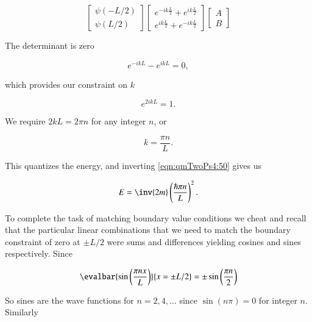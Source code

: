 \begin{equation}\label{eqn:qmTwoPs4:90}
\begin{bmatrix}
\psi(-L/2) \\
\psi(L/2)
\end{bmatrix}
\begin{bmatrix}
e^{ -i k \frac{L}{2} } +e^{ i k \frac{L}{2} } \\
e^{ i k \frac{L}{2} } +e^{ -i k \frac{L}{2} }
\end{bmatrix}
\begin{bmatrix}
A \\
B
\end{bmatrix}
\end{equation}

The determinant is zero

\begin{equation}\label{eqn:qmTwoPs4:110}
e^{-i k L} - e^{i k L} = 0,
\end{equation}

which provides our constraint on $k$ 

\begin{equation}\label{eqn:qmTwoPs4:130}
e^{2 i k L} = 1.
\end{equation}

We require $2 k L = 2 \pi n$ for any integer $n$, or

\begin{equation}\label{eqn:qmTwoPs4:150}
k = \frac{\pi n}{L}.
\end{equation}

This quantizes the energy, and inverting \ref{eqn:qmTwoPs4:50} gives us

\begin{equation}\label{eqn:qmTwoPs4:170}
E = \inv{2m} \left( \frac{\hbar \pi n }{L} \right)^2.
\end{equation}

To complete the task of matching boundary value conditions we cheat and recall that the particular linear combinations that we need to match the boundary constraint of zero at $\pm L/2$ were sums and differences yielding cosines and sines respectively.  Since

\begin{equation}\label{eqn:qmTwoPs4:190}
\evalbar{\sin\left( \frac{\pi n x }{L} \right) }{x = \pm L/2} = 
\pm \sin\left(\frac{\pi n}{2}\right)
\end{equation}

So sines are the wave functions for $n = 2, 4, ...$ since $\sin(n \pi) = 0$ for integer $n$.  Similarly

